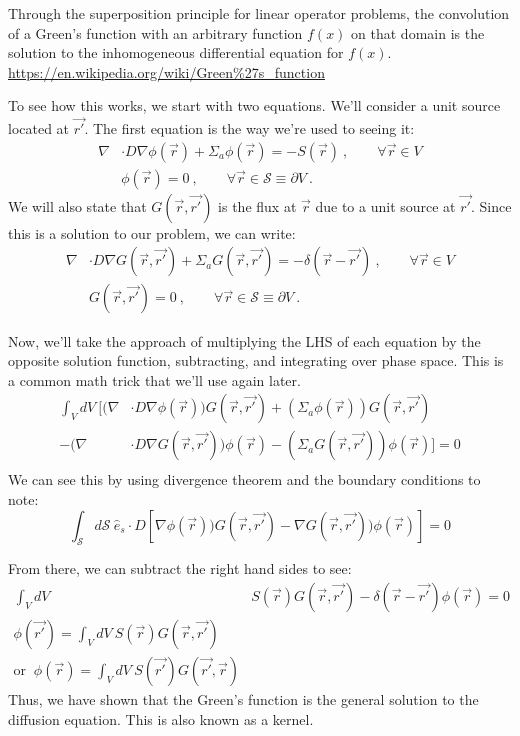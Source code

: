 \documentclass[12pt]{article}
\begin{document}
Through the superposition principle for linear operator problems, the convolution of a Green's function with an arbitrary function $f(x)$ on that domain is the solution to the inhomogeneous differential equation for $f (x)$. \url{https://en.wikipedia.org/wiki/Green\%27s_function}

To see how this works, we start with two equations. We'll consider a unit source located at $\vec{r'}$. The first equation is the way we're used to seeing it:
\begin{align}
\nabla &\cdot D \nabla \phi(\vec{r}) + \Sigma_a \phi(\vec{r}) = -S(\vec{r}) \:, \qquad \forall \vec{r} \in V  \\
%
&\phi(\vec{r}) = 0\:, \qquad \forall \vec{r} \in \mathcal{S} \equiv \partial V\:.\ \nonumber
 \label{eq:de}
\end{align}
%
We will also state that $G(\vec{r}, \vec{r'})$ is the flux at $\vec{r}$ due to a unit source at $\vec{r'}$. Since this is a solution to our problem, we can write:
\begin{align}
\nabla &\cdot D \nabla G(\vec{r}, \vec{r'}) + \Sigma_a G(\vec{r}, \vec{r'}) = -\delta(\vec{r} - \vec{r'}) \:, \qquad \forall \vec{r} \in V  \\
%
&G(\vec{r}, \vec{r'}) = 0\:, \qquad \forall \vec{r} \in \mathcal{S} \equiv \partial V\:. \nonumber
\label{eq:green}
\end{align}

Now, we'll take the approach of multiplying the LHS of each equation by the opposite solution function, subtracting, and integrating over phase space. This is a common math trick that we'll use again later.
\begin{align*}
\int_V dV\: \bigl[(\nabla &\cdot D \nabla \phi(\vec{r}))G(\vec{r}, \vec{r'}) + (\Sigma_a \phi(\vec{r})) G(\vec{r}, \vec{r'}) \\
-(\nabla &\cdot D \nabla G(\vec{r}, \vec{r'}))\phi(\vec{r}) - (\Sigma_a G(\vec{r}, \vec{r'}))\phi(\vec{r}) \bigr] = 0\\
\end{align*}
We can see this by using divergence theorem and the boundary conditions to note:
\[\int_{\mathcal{S}} d\mathcal{S}\: \hat{e}_s \cdot D[\nabla \phi(\vec{r}))G(\vec{r}, \vec{r'}) - \nabla G(\vec{r}, \vec{r'}))\phi(\vec{r})] = 0\]

From there, we can subtract the right hand sides to see:
\begin{align*}
\int_V dV\: &S(\vec{r})G(\vec{r}, \vec{r'}) - \delta(\vec{r} - \vec{r'})\phi(\vec{r}) = 0\\%
\phi(\vec{r'}) = \int_V dV\: S(\vec{r})G(\vec{r}, \vec{r'})\\
\text{or }\: \phi(\vec{r}) = \int_V dV\: S(\vec{r'})G(\vec{r'}, \vec{r})
\end{align*}
%
Thus, we have shown that the Green's function is the general solution to the diffusion equation. This is also known as a kernel.
\end{document}

